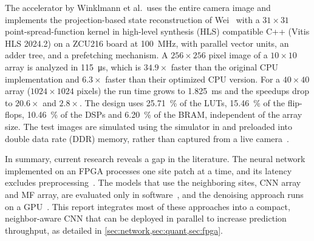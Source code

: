 The accelerator by Winklmann et al.\ uses the entire camera image and implements the projection-based state reconstruction of Wei~\cite{wei2023} with a $31\times31$ point-spread-function kernel in high-level synthesis (HLS) compatible C++ (Vitis HLS 2024.2) on a ZCU216 board at \SI{100}{\mega\hertz}, with parallel vector units, an adder tree, and a prefetching mechanism. A $256\times256$ pixel image of a $10\times10$ array is analyzed in \SI{115}{\micro\second}, which is $34.9\times$ faster than the original CPU implementation and $6.3\times$ faster than their optimized CPU version. For a $40\times40$ array ($1024\times1024$ pixels) the run time grows to \SI{1.825}{\milli\second} and the speedups drop to $20.6\times$ and $2.8\times$. The design uses \SI{25.71}{\percent} of the LUTs, \SI{15.46}{\percent} of the flip-flops, \SI{10.46}{\percent} of the DSPs and \SI{6.20}{\percent} of the BRAM, independent of the array size. The test images are simulated using the simulator in \cite{winklmann2023} and preloaded into double data rate (DDR) memory, rather than captured from a live camera~\cite{winklmann2026accelerator}.

\medskip

In summary, current research reveals a gap in the literature. The neural network implemented on an FPGA processes one site patch at a time, and its latency excludes preprocessing~\cite{su2026}. The models that use the neighboring sites, CNN array and MF array, are evaluated only in software~\cite{phuttitarn2023,kent2025}, and the denoising approach runs on a GPU~\cite{mude2025}. This report integrates most of these approaches into a compact, neighbor-aware CNN that can be deployed in parallel to increase prediction throughput, as detailed in \cref{sec:network,sec:quant,sec:fpga}.
